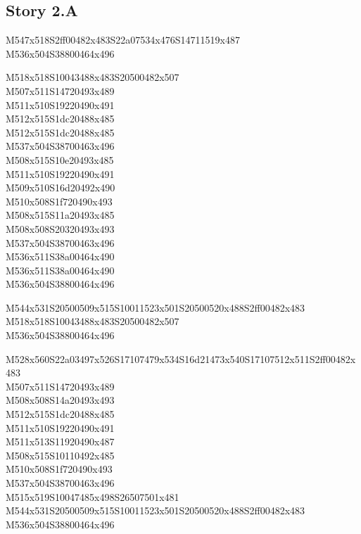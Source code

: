 \documentclass{article}
\begin{document}
\subsection{Story 2.A}

\begin{multicols}{5}
\begin{center}
M547x518S2ff00482x483S22a07534x476S14711519x487 %
\\M536x504S38800464x496 %

M518x518S10043488x483S20500482x507 %
\\M507x511S14720493x489 %
\\M511x510S19220490x491 %
\\M512x515S1dc20488x485 %
\\M512x515S1dc20488x485 %
\\M537x504S38700463x496 %
\\M508x515S10e20493x485 %
\\M511x510S19220490x491 %
\\M509x510S16d20492x490 %
\\M510x508S1f720490x493 %
\\M508x515S11a20493x485 %
\\M508x508S20320493x493 %
\\M537x504S38700463x496 %
\\M536x511S38a00464x490 %
\\M536x511S38a00464x490 %
\\M536x504S38800464x496 %

M544x531S20500509x515S10011523x501S20500520x488S2ff00482x483 %
\\M518x518S10043488x483S20500482x507 %
\\M536x504S38800464x496 %

M528x560S22a03497x526S17107479x534S16d21473x540S17107512x511S2ff00482x483 %
\\M507x511S14720493x489 %
\\M508x508S14a20493x493 %
\\M512x515S1dc20488x485 %
\\M511x510S19220490x491 %
\\M511x513S11920490x487 %
\\M508x515S10110492x485 %
\\M510x508S1f720490x493 %
\\M537x504S38700463x496 %
\\M515x519S10047485x498S26507501x481 %
\\M544x531S20500509x515S10011523x501S20500520x488S2ff00482x483 %
\\M536x504S38800464x496 %


\end{center}
\end{multicols}
\end{document}
